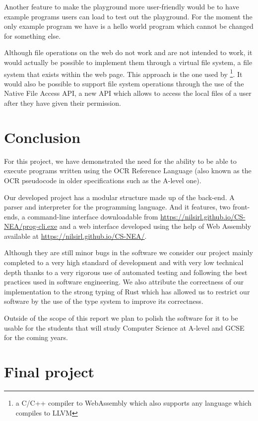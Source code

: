 \documentclass{article}
\begin{document}
Another feature to make the playground more user-friendly would be to have
example programs users can load to test out the playground. For the moment the
only example program we have is a hello world program which cannot be changed
for something else.

Although file operations on the web do not work and are not intended to work,
it would actually be possible to implement them through a virtual file system,
a file system that exists within the web page. This approach is the one used by
\footnote{a C/C++ compiler to WebAssembly which also
supports any language which compiles to LLVM}. It would also be possible to
support file system operations through the use of the Native File Access API, a
new API which allows to access the local files of a user after they have given
their permission.

\section{Conclusion}

For this project, we have demonstrated the need for the ability to be able to
execute programs written using the OCR Reference Language (also known as the
OCR pseudocode in older specifications such as the A-level one).

Our developed project has a modular structure made up of the back-end. A parser
and interpreter for the programming language. And it features, two front-ends,
a command-line interface downloadable from
\url{https://nilsirl.github.io/CS-NEA/prog-cli.exe} and a web interface
developed using the help of Web Assembly available at
\url{https://nilsirl.github.io/CS-NEA/}.

Although they are still minor bugs in the software we consider our project
mainly completed to a very high standard of development and with very low
technical depth thanks to a very rigorous use of automated testing and
following the best practices used in software engineering. We also attribute
the correctness of our implementation to the strong typing of Rust which has
allowed us to restrict our software by the use of the type system to improve
its correctness.

Outside of the scope of this report we plan to polish the software for it to be
usable for the students that will study Computer Science at A-level and GCSE
for the coming years.

\section{Final project}
\label{sec:final_project}
\end{document}
